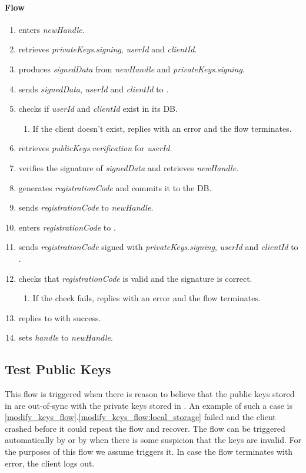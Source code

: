 \documentclass[a4paper,10pt,draft]{article}
\newcommand{\signedData}{\emph{signedData}}
\newcommand{\handle}{\emph{handle}}
\newcommand{\registrationCode}{\emph{registrationCode}}
\newcommand{\privateKeys}{\emph{privateKeys}}
\newcommand{\publicKeys}{\emph{publicKeys}}
\newcommand{\signingKey}{\privateKeys{}.\emph{signing}}
\newcommand{\verificationKey}{\publicKeys{}.\emph{verification}}
\newcommand{\userId}{\emph{userId}}
\newcommand{\clientId}{\emph{clientId}}
\newcommand{\newHandle}{\emph{newHandle}}
\begin{document}
\paragraph{Flow}

\begin{enumerate}
 \item \User{} enters \newHandle{}.
 \item \Client{} retrieves \signingKey{}, \userId{} and \clientId{}.
 \item \Client{} produces \signedData{} from \newHandle{} and \signingKey{}.
 \item \Client{} sends \signedData{}, \userId{} and \clientId{} to \Server{}.
 \item \Server{} checks if \userId{} and \clientId{} exist in its DB.
 \begin{enumerate}
  \item If the client doesn't exist, \Server{} replies with an error and the flow terminates.
 \end{enumerate}
 \item \Server{} retrieves \verificationKey{} for \userId{}.
 \item \Server{} verifies the signature of \signedData{} and retrieves \newHandle{}.
 \item \Server{} generates \registrationCode{} and commits it to the DB.
 \item \Server{} sends \registrationCode{} to \newHandle{}.
 \item \User{} enters \registrationCode{} to \Client{}.
 \item \Client{} sends \registrationCode{} signed with \signingKey{}, \userId{} and \clientId{} to \Server{}.
 \item \Server{} checks that \registrationCode{} is valid and the signature is correct.
 \begin{enumerate}
  \item If the check fails, \Server{} replies with an error and the flow terminates.
 \end{enumerate}
 \item \Server{} replies to \Client{} with success.
 \item \Client{} sets \handle{} to \newHandle{}.
\end{enumerate}

\subsection{Test Public Keys}
\label{test_public_keys_flow}
This flow is triggered when there is reason to believe that the public keys stored in \Server{} are out-of-sync with the private keys stored in \Client{}. An example of such a 
case is \ref{modify_keys_flow}.\ref{modify_keys_flow:local_storage} failed and the client crashed before it could repeat the flow and recover. The flow can be triggered 
automatically by \Client{} or by \User{} when there is some suspicion that the keys are invalid. For the purposes of this flow we assume \Client{} triggers it. In case the flow 
terminates with error, the client logs out.
\end{document}
